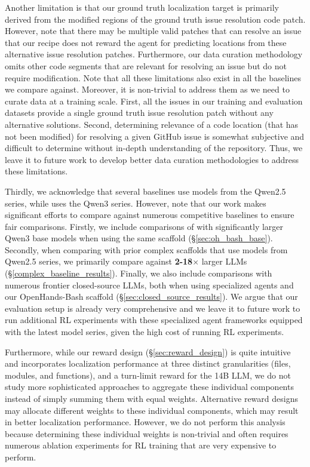 Another limitation is that our ground truth localization target is primarily derived from the modified regions of the ground truth issue resolution code patch. However, note that there may be multiple valid patches that can resolve an issue that our recipe does not reward the agent for predicting locations from these alternative issue resolution patches. Furthermore, our data curation methodology omits other code segments that are relevant for resolving an issue but do not require modification. Note that all these limitations also exist in all the baselines we compare \methodname against. Moreover, it is non-trivial to address them as we need to curate data at a training scale. First, all the issues in our training and evaluation datasets provide a single ground truth issue resolution patch without any alternative solutions. Second, determining relevance of a code location (that has not been modified) for resolving a given GitHub issue is somewhat subjective and difficult to determine without in-depth understanding of the repository. Thus, we leave it to future work to develop better data curation methodologies to address these limitations.

Thirdly, we acknowledge that several baselines use models from the Qwen2.5 series, while \methodname uses the Qwen3 series. However, note that our work makes significant efforts to compare \methodname against numerous competitive baselines to ensure fair comparisons. Firstly, we include comparisons of \methodname with significantly larger Qwen3 base models when using the same scaffold (\S\ref{sec:oh_bash_base}). Secondly, when comparing with prior complex scaffolds that use models from Qwen2.5 series, we primarily compare \methodname against \textbf{2-18$\times$} larger LLMs (\S\ref{complex_baseline_results}). Finally, we also include comparisons with numerous frontier closed-source LLMs, both when using specialized agents and our OpenHands-Bash scaffold (\S\ref{sec:closed_source_results}). We argue that our evaluation setup is already very comprehensive and we leave it to future work to run additional RL experiments with these specialized agent frameworks equipped with the latest model series, given the high cost of running RL experiments.

Furthermore, while our reward design (\S\ref{sec:reward_design}) is quite intuitive and incorporates localization performance at three distinct granularities (files, modules, and functions), and a turn-limit reward for the 14B LLM, we do not study more sophisticated approaches to aggregate these individual components instead of simply summing them with equal weights. Alternative reward designs may allocate different weights to these individual components, which may result in better localization performance. However, we do not perform this analysis because determining these individual weights is non-trivial and often requires numerous ablation experiments for RL training that are very expensive to perform.

